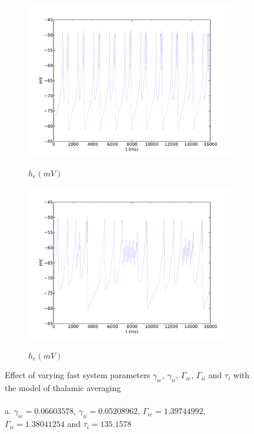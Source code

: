 \documentclass[a4paper,12pt]{article}
\begin{document}
\begin{figure}
\begin{subfigure}[b]{0.5\textwidth}
		\includegraphics[scale=0.35]{chosen-frontiers-2012/00143-1-0_4-6-he-thal.pdf}
		\label{fig:00143_c}
		\caption{$h_e (mV)$}
	\end{subfigure}
	\begin{subfigure}[b]{0.5\textwidth}
		\includegraphics[scale=0.35]{chosen-frontiers-2012/00143-1-1-5-he-thal.pdf}
		\label{fig:00143_d}
		\caption{$h_e (mV)$}
	\end{subfigure}
	\label{fig:00143}
	\caption{Effect of varying fast system parameters $\gamma_{ie}$, $\gamma_{ii}$, $\Gamma_{ie}$, $\Gamma_{ii}$ and $\tau_i$ with the model of thalamic averaging\\
\\
a. $\gamma_{ie} = 0.06603578$, $\gamma_{ii} = 0.05208962$, $\Gamma_{ie} = 1.39744992$, $\Gamma_{ii} = 1.38041254$ and $\tau_i = 135.1578$ \\
}
\end{figure}
\end{document}
